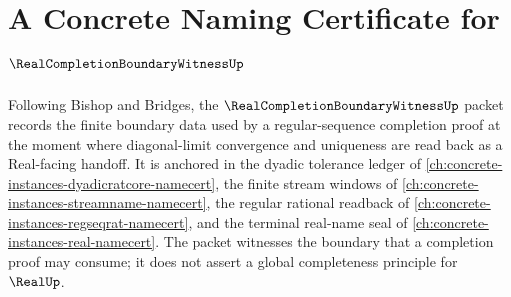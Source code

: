 \chapter{A Concrete Naming Certificate for $\RealCompletionBoundaryWitnessUp$}
\label{ch:concrete-instances-real-completion-boundary-witness-namecert}

Following Bishop and Bridges, the $\RealCompletionBoundaryWitnessUp$ packet records the finite boundary data used by a regular-sequence completion proof at the moment where diagonal-limit convergence and uniqueness are read back as a Real-facing handoff. It is anchored in the dyadic tolerance ledger of \autoref{ch:concrete-instances-dyadicratcore-namecert}, the finite stream windows of \autoref{ch:concrete-instances-streamname-namecert}, the regular rational readback of \autoref{ch:concrete-instances-regseqrat-namecert}, and the terminal real-name seal of \autoref{ch:concrete-instances-real-namecert}. The packet witnesses the boundary that a completion proof may consume; it does not assert a global completeness principle for $\RealUp$.

